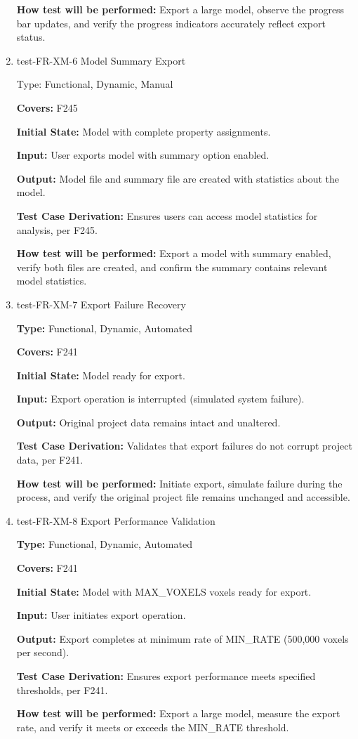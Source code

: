 \documentclass[12pt, titlepage]{article}
\begin{document}
\begin{enumerate}
\textbf{How test will be performed:} Export a large model, observe the progress bar updates, and verify the progress indicators accurately reflect export status.

\item{test-FR-XM-6 Model Summary Export\\}

Type: Functional, Dynamic, Manual

\textbf{Covers:} F245
					
\textbf{Initial State:} Model with complete property assignments.
					
\textbf{Input:} User exports model with summary option enabled.
					
\textbf{Output:} Model file and summary file are created with statistics about the model.

\textbf{Test Case Derivation:} Ensures users can access model statistics for analysis, per F245.
					
\textbf{How test will be performed:} Export a model with summary enabled, verify both files are created, and confirm the summary contains relevant model statistics.

\item{test-FR-XM-7 Export Failure Recovery\\}

\textbf{Type:} Functional, Dynamic, Automated

\textbf{Covers:} F241
					
\textbf{Initial State:} Model ready for export.
					
\textbf{Input:} Export operation is interrupted (simulated system failure).
					
\textbf{Output:} Original project data remains intact and unaltered.

\textbf{Test Case Derivation:} Validates that export failures do not corrupt project data, per F241.
					
\textbf{How test will be performed:} Initiate export, simulate failure during the process, and verify the original project file remains unchanged and accessible.

\item{test-FR-XM-8 Export Performance Validation\\}

\textbf{Type:} Functional, Dynamic, Automated

\textbf{Covers:} F241
					
\textbf{Initial State:} Model with MAX\_VOXELS voxels ready for export.
					
\textbf{Input:} User initiates export operation.
					
\textbf{Output:} Export completes at minimum rate of MIN\_RATE (500,000 voxels per second).

\textbf{Test Case Derivation:} Ensures export performance meets specified thresholds, per F241.
					
\textbf{How test will be performed:} Export a large model, measure the export rate, and verify it meets or exceeds the MIN\_RATE threshold.

\end{enumerate}
\end{document}
